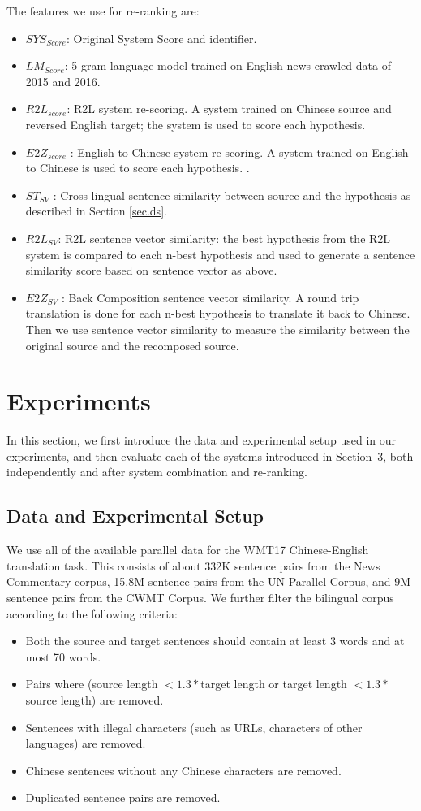 \documentclass[a4paper]{article}
\begin{document}
\begin{CJK*}{UTF8}{gbsn}
The features we use for re-ranking are:
\begin{itemize}
\item $SYS_{Score}$: Original System Score and identifier. 
\item $LM_{Score}$: 5-gram language model trained on English news crawled data of 2015 and 2016. 
\item $R2L_{score}$: R2L system re-scoring. A system trained on Chinese source and reversed English target; the system is used to score each hypothesis.
\item $E2Z_{score}$ : English-to-Chinese  system re-scoring. A system trained on English to Chinese is used to score each hypothesis. .
\item $ST_{SV}$ : Cross-lingual sentence similarity between source and the hypothesis as described in Section \ref{sec.ds}. 
\item $R2L_{SV}$: R2L sentence vector similarity: the best hypothesis from the R2L system is compared to each n-best hypothesis and used to generate a sentence similarity score based on sentence vector as above.
\item  $E2Z_{SV}$ : Back Composition  sentence vector similarity.  A round trip translation is done for each n-best hypothesis to translate it back to Chinese. Then we use sentence vector similarity to measure the similarity between the original source and the recomposed source.
\end{itemize}
 
\section{Experiments}
\label{sec:experiments}


In this section, we first introduce the data and experimental setup used in our experiments, and then evaluate each of the systems introduced in Section~3, both independently and after system combination and re-ranking.

\subsection{Data and Experimental Setup}
We use all of the available parallel data for the WMT17 Chinese-English translation task. This consists of about 332K sentence pairs from the News Commentary corpus, 15.8M sentence pairs from the UN Parallel Corpus, and 9M sentence pairs from the CWMT Corpus. We further filter the bilingual corpus according to the following criteria:
\begin{itemize}
\item Both the source and target sentences should contain at least 3 words and at most 70 words.
\item Pairs where (source length $< 1.3*$target length or target length $< 1.3*$source length) are removed.
\item Sentences with illegal characters (such as URLs, characters of other languages) are removed. 
\item Chinese sentences without any Chinese characters are removed.
\item Duplicated sentence pairs are removed.
\end{itemize}


\end{CJK*}
\end{document}
